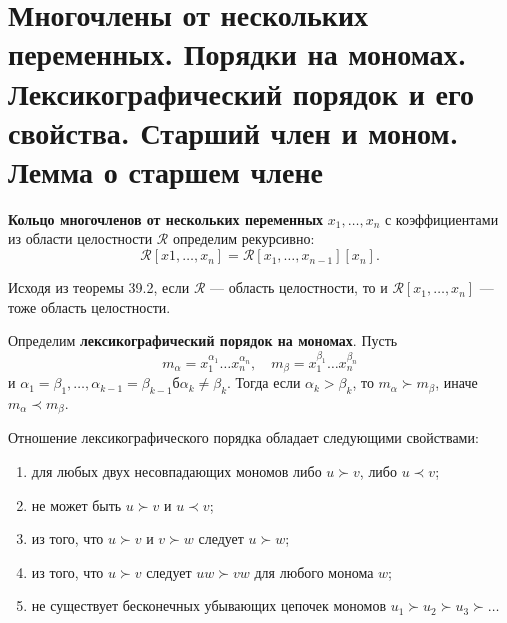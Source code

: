 \section{Многочлены от нескольких переменных. Порядки на мономах. Лексикографический порядок и его свойства. Старший член и моном. Лемма о старшем члене}

\begin{definition}
    \textbf{Кольцо многочленов от нескольких переменных} $x_1, \ldots, x_n$ с коэффициентами из области целостности $\mathcal{R}$ определим рекурсивно:
    $$
    \mathcal{R}[x1, \ldots, x_n] = \mathcal{R}[x_1, \ldots, x_{n - 1}][x_n].
    $$
\end{definition}

Исходя из теоремы 39.2, если $\mathcal{R}$ --- область целостности, то и $\mathcal{R}[x_1, \ldots, x_n]$ --- тоже область целостности.

\begin{definition}
    Определим \textbf{лексикографический порядок на мономах}. Пусть
    $$
    m_\alpha = x_1^{\alpha_1}\ldots x_n^{\alpha_n},\quad m_\beta = x_1^{\beta_1}\ldots x_n^{\beta_n}
    $$
    и $\alpha_1 = \beta_1, \ldots, \alpha_{k - 1} = \beta_{k - 1}б \alpha_k \ne \beta_k$. Тогда если $\alpha_k > \beta_k$, то $m_\alpha \succ m_\beta$, иначе $m_\alpha \prec m_\beta$.
\end{definition}

\begin{theorem}
    Отношение лексикографического порядка обладает следующими свойствами:
    \begin{enumerate}[nolistsep]
        \item для любых двух несовпадающих мономов либо $u \succ v$, либо $u \prec v$;
        \item не может быть $u \succ v$ и $u \prec v$;
        \item из того, что $u \succ v$ и $v \succ w$ следует $u \succ w$;
        \item из того, что $u \succ v$ следует $uw \succ vw$ для любого монома $w$;
        \item не существует бесконечных убывающих цепочек мономов $u_1 \succ u_2 \succ u_3 \succ \ldots$
    \end{enumerate}
\end{theorem}

